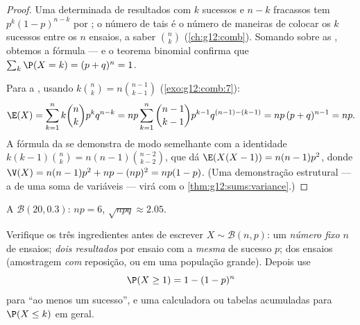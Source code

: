 \begin{proof}
Uma  determinada de resultados com $k$ sucessos e $n-k$ fracassos
tem  $p^k(1-p)^{n-k}$ por ; o número de tais
 é o número de maneiras de colocar os $k$ sucessos entre os $n$
ensaios, a saber $\binom nk$ (\cref{ch:g12:comb}). Somando sobre as
, obtemos a fórmula --- e o teorema binomial confirma que
$\sum_k \P(X = k) = (p + q)^n = 1$.

Para a , usando $k\binom nk = n\binom{n-1}{k-1}$
(\cref{exo:g12:comb:7}):
\[
\E(X) = \sum_{k=1}^{n} k\binom nk p^k q^{n-k}
= np\sum_{k=1}^{n} \binom{n-1}{k-1} p^{k-1} q^{(n-1)-(k-1)}
= np\,(p + q)^{n-1} = np .
\]
A fórmula da  se demonstra de modo semelhante com a identidade
$k(k-1)\binom nk = n(n-1)\binom{n-2}{k-2}$, que dá
$\E(X(X-1)) = n(n-1)p^2$, donde
$\V(X) = n(n-1)p^2 + np - (np)^2 = np(1-p)$. (Uma demonstração estrutural
--- a  de uma soma de variáveis  --- virá com o
\cref{thm:g12:sums:variance}.)
\end{proof}

\begin{omfigure}

{\small A  $\mathcal B(20, 0.3)$:  $np = 6$,  $\sqrt{npq} \approx 2.05$.}
\end{omfigure}

\begin{method}\label{met:g12:randvar:recognize}
Verifique os três ingredientes antes de escrever $X \sim \mathcal B(n,p)$:
um \emph{número fixo} $n$ de ensaios; \emph{dois resultados} por ensaio
com a \emph{mesma}  de sucesso $p$; \emph{} dos
ensaios (amostragem \emph{com} reposição, ou em uma população grande).
Depois use
\[
\P(X \geq 1) = 1 - (1-p)^n
\]
para ``ao menos um sucesso'', e uma calculadora ou tabelas acumuladas para
$\P(X \leq k)$ em geral.
\end{method}

